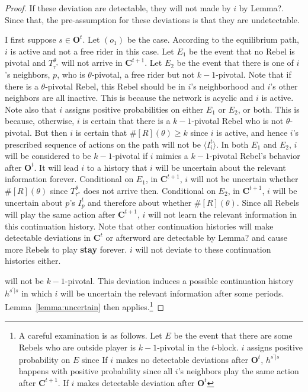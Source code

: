 \documentclass[12pt,letter]{article}
\newcommand{\Kappa}{\mathbf{C}}
\newcommand{\Omicron}{\mathbf{O}}
\theoremstyle{definition}
\theoremstyle{remark}
\theoremstyle{claim}
\begin{document}
\begin{proof}
If these deviation are detectable, they will not made by $i$ by Lemma?. Since that, the pre-assumption for these deviations is that they are undetectable. 

I first suppose $s\in\Omicron^t$. Let $(o_1)$ be the case. According to the equilibrium path, $i$ is active and not a free rider in this case. Let $E_1$ be the event that no Rebel is pivotal and $T^{\theta}_{\tau^{*}}$ will not arrive in $\Kappa^{t+1}$. Let $E_2$ be the event that there is one of $i$'s neighbors, $p$, who is $\theta$-pivotal, a free rider but not $k-1$-pivotal. Note that if there is a $\theta$-pivotal Rebel, this Rebel should be in $i$'s neighborhood and $i$'s other neighbors are all inactive. This is because the network is acyclic and $i$ is active. Note also that $i$ assigns positive probabilities on either $E_1$ or $E_2$, or both. This is because, otherwise, $i$ is certain that there is a $k-1$-pivotal Rebel who is not $\theta$-pivotal. But then $i$ is certain that $\#[R](\theta)\geq k$ since $i$ is active, and hence $i$'s prescribed sequence of actions on the path will not be $\langle I^{t}_i \rangle$. In both $E_1$ and $E_2$, $i$ will be considered to be $k-1$-pivotal if $i$ mimics a $k-1$-pivotal Rebel's behavior after $\Omicron^{t}$. It will lead $i$ to a history that $i$ will be uncertain about the relevant information forever. Conditional on $E_1$, in $\Kappa^{t+1}$, $i$ will not be uncertain whether $\#[R](\theta)$ since $T^{\theta}_{\tau^{*}}$ does not arrive then. Conditional on $E_2$, in $\Kappa^{t+1}$, $i$ will be uncertain about $p$'s $I^t_{p}$ and therefore about whether $\#[R](\theta)$. Since all Rebels will play the same action after $\Kappa^{t+1}$, $i$ will not learn the relevant information in this continuation history. Note that other continuation histories will make detectable deviations in $\Kappa^t$ or afterword are detectable by Lemma? and cause more Rebels to play \textbf{stay} forever. $i$ will not deviate to these continuation histories either.

will not be $k-1$-pivotal. This deviation induces a possible continuation history $h^{s^{'}|s}$ in which $i$ will be uncertain the relevant information after some periods. Lemma~\ref{lemma:uncertain} then applies.\footnote{A careful examination is as follows. Let $E$ be the event that there are some Rebels who  are outside player is $k-1$-pivotal in the $t$-block. $i$ assigns positive probability on $E$ since   If $i$ makes no detectable deviations after $\Omicron^t$, $h^{s^{'}|s}$ happens with positive probability since all $i$'s neighbors play the same action after $\Kappa^{t+1}$. If $i$ makes detectable deviation after $\Omicron^t$}
\end{proof}
\end{document}
